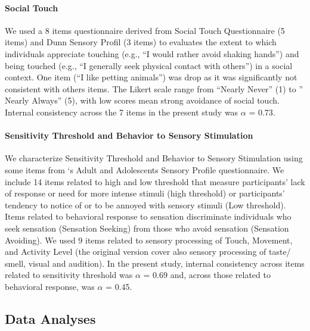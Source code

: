 \documentclass[preprint, 3p,
authoryear]{elsarticle} %
\begin{document}
\hypertarget{social-touch}{%
\paragraph{Social Touch}\label{social-touch}}

We used a 8 items questionnaire derived from Social Touch Questionnaire
(5 items) \citep{wilhelm_social_2001} and Dunn Sensory Profil (3
items)\citep{brown_adolescentadult_2002} to evaluates the extent to
which individuals appreciate touching (e.g., ``I would rather avoid
shaking hands'') and being touched (e.g., ``I generally seek physical
contact with others'') in a social context. One item (``I like petting
animals'') was drop as it was significantly not consistent with others
items. The Likert scale range from ``Nearly Never'' (1) to '' Nearly
Always'' (5), with low scores mean strong avoidance of social touch.
Internal consistency across the 7 items in the present study was
\(\alpha\) = 0.73.

\hypertarget{sensitivity-threshold-and-behavior-to-sensory-stimulation}{%
\paragraph{Sensitivity Threshold and Behavior to Sensory
Stimulation}\label{sensitivity-threshold-and-behavior-to-sensory-stimulation}}

We characterize Sensitivity Threshold and Behavior to Sensory
Stimulation using some items from \citet{brown_adolescentadult_2002}`s
Adult and Adolescents Sensory Profile questionnaire. We include 14 items
related to high and low threshold that measure participants' lack of
response or need for more intense stimuli (high threshold) or
participants' tendency to notice of or to be annoyed with sensory
stimuli (Low threshold). Items related to behavioral response to
sensation discriminate individuals who seek sensation (Sensation
Seeking) from those who avoid sensation (Sensation Avoiding). We used 9
items related to sensory processing of Touch, Movement, and Activity
Level (the original version cover also sensory processing of taste/
smell, visual and audition). In the present study, internal consistency
across items related to sensitivity threshold was \(\alpha\) = 0.69 and,
across those related to behavioral response, was \(\alpha\) = 0.45.

\hypertarget{data-analyses}{%
\subsection{Data Analyses}\label{data-analyses}}
\end{document}
